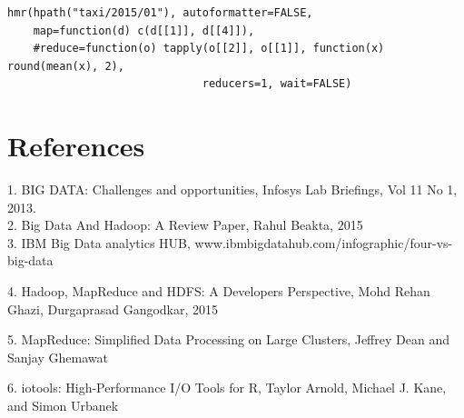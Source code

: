 \documentclass[11pt]{book}
\begin{document}
\begin{verbatim}
hmr(hpath("taxi/2015/01"), autoformatter=FALSE,
    map=function(d) c(d[[1]], d[[4]]),
    #reduce=function(o) tapply(o[[2]], o[[1]], function(x) round(mean(x), 2),
                              reducers=1, wait=FALSE)
\end{verbatim}


\chapter{References}
1. BIG DATA: Challenges and opportunities, Infosys Lab Briefings,
Vol 11 No 1, 2013. \\

2. Big Data And Hadoop: A Review Paper, Rahul Beakta, 2015 \\

 3. IBM Big Data analytics HUB,
www.ibmbigdatahub.com/infographic/four-vs-big-data

4. Hadoop, MapReduce and HDFS: A Developers Perspective, 
Mohd Rehan Ghazi, Durgaprasad Gangodkar, 2015

5. MapReduce: Simplified Data Processing on Large Clusters, 
Jeffrey Dean and Sanjay Ghemawat

6. iotools: High-Performance I/O Tools for R, 
Taylor Arnold, Michael J. Kane, and Simon Urbanek
\end{document}
